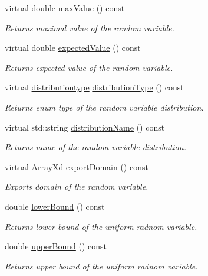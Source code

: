 \begin{DoxyCompactItemize}
virtual double \hyperlink{class_c_uniform_c_r_v_a917b27c8372bf94a31e710841a355e13}{max\-Value} () const 
\begin{DoxyCompactList}\small\item\em Returns maximal value of the random variable. \end{DoxyCompactList}\item 
virtual double \hyperlink{class_c_uniform_c_r_v_afc515a14464bb983da4c437a008d5c38}{expected\-Value} () const 
\begin{DoxyCompactList}\small\item\em Returns expected value of the random variable. \end{DoxyCompactList}\item 
virtual \hyperlink{class_c_random_variable_a80d2a87c43847274138b51f7d713d7f1}{distributiontype} \hyperlink{class_c_uniform_c_r_v_a1ea0e361abe25eb3bd79608c8dbaaccc}{distribution\-Type} () const 
\begin{DoxyCompactList}\small\item\em Returns enum type of the random variable distribution. \end{DoxyCompactList}\item 
virtual std\-::string \hyperlink{class_c_uniform_c_r_v_a1bff9ea048929a6c3c923955b66cc288}{distribution\-Name} () const 
\begin{DoxyCompactList}\small\item\em Returns name of the random variable distribution. \end{DoxyCompactList}\item 
virtual Array\-Xd \hyperlink{class_c_uniform_c_r_v_aa0a19d1aeb632dc1db794bafbf3dfa2c}{export\-Domain} () const 
\begin{DoxyCompactList}\small\item\em Exports domain of the random variable. \end{DoxyCompactList}\item 
double \hyperlink{class_c_uniform_c_r_v_ad64be7b062b81068d1320c2b7b7b2796}{lower\-Bound} () const 
\begin{DoxyCompactList}\small\item\em Returns lower bound of the uniform radnom variable. \end{DoxyCompactList}\item 
double \hyperlink{class_c_uniform_c_r_v_a9601e01cb67bc5bcfec79797488fd34e}{upper\-Bound} () const 
\begin{DoxyCompactList}\small\item\em Returns upper bound of the uniform radnom variable. \end{DoxyCompactList}\item 

\end{DoxyCompactItemize}
